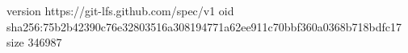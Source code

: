 version https://git-lfs.github.com/spec/v1
oid sha256:75b2b42390c76e32803516a308194771a62ee911c70bbf360a0368b718bdfc17
size 346987

